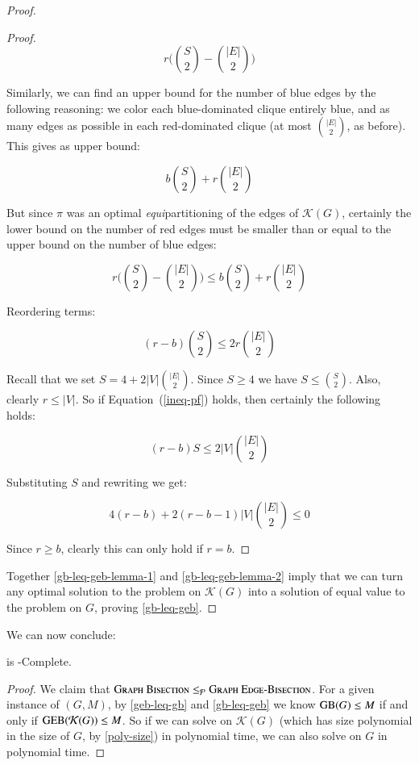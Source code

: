 \begin{proof}
\begin{proof}
			$$r \Big( \binom{S}{2} - \binom{|E|}{2}\Big)$$

			Similarly, we can find an upper bound for the number of blue edges
			by the following reasoning: we color each blue-dominated clique
			entirely blue, and as many edges as possible in each red-dominated
			clique (at most $\binom{|E|}{2}$, as before). This gives as
			upper bound:

			$$b\binom{S}{2} + r\binom{|E|}{2}$$

			But since $\pi$ was an optimal \textit{equi}partitioning of the
			edges of $\mathcal{K}(G)$, certainly the lower bound on the number
			of red edges must be smaller than or equal to the upper bound on
			the number of blue edges:

			$$r\Big( \binom{S}{2} - \binom{|E|}{2}\Big)
				\leq b\binom{S}{2} + r\binom{|E|}{2}$$

			Reordering terms:

			\begin{equation}
				\label{ineq-pf}
				(r-b)\binom{S}{2} \leq 2r\binom{|E|}{2}
			\end{equation}

			Recall that we set $S = 4 + 2|V|\binom{|E|}{2}$. Since $S \geq 4$
			we have $S \leq \binom{S}{2}$. Also, clearly $r \leq |V|$. So if
			Equation~(\ref{ineq-pf}) holds, then certainly the following holds:

			$$(r-b)S \leq 2|V|\binom{|E|}{2}$$

			Substituting $S$ and rewriting we get:

			$$4(r-b) + 2(r-b-1)|V|\binom{|E|}{2} \leq 0$$
 
			Since $r \geq b$, clearly this can only hold if $r=b$.
		\end{proof}

		Together \autoref{gb-leq-geb-lemma-1} and \autoref{gb-leq-geb-lemma-2}
		imply that we can turn any optimal solution to the \geb problem on
		$\mathcal{K}(G)$ into a solution of equal value to the \gb problem on
		$G$, proving \autoref{gb-leq-geb}.
	\end{proof}

	We can now conclude:

	\begin{theorem}
		\geb is \NP-Complete.
	\end{theorem}
	\begin{proof}
		We claim that $\textsc{Graph \allowbreak Bisection} \leq_{\mathcal{P}} \textsc{Graph \allowbreak Edge-\allowbreak Bisection}$.
		For a given instance of \gb $(G, M)$, by \autoref{geb-leq-gb} and
		\autoref{gb-leq-geb} we know
		$\textsc{GB}(G) \leq M$ if and only if $\textsc{GEB}(\mathcal{K}(G)) \leq M$. So
		if we can solve \geb on $\mathcal{K}(G)$ (which has size polynomial
		in the size of $G$, by \autoref{poly-size}) in polynomial time, we can
		also solve \gb on $G$ in polynomial time.
	\end{proof}

